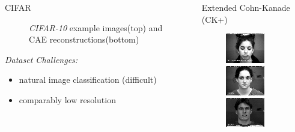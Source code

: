\documentclass[final]{beamer}
\newlength{\onecolwid}
\newlength{\threecolwid}
\begin{document}
\begin{frame}[t]
\begin{columns}[t]
\begin{column}{\threecolwid}
\begin{columns}[T, totalwidth=\threecolwid]
\begin{column}{\onecolwid}
\begin{block}{CIFAR}
\begin{figure}
\caption{\emph{CIFAR-10} example images(top) and CAE reconstructions(bottom)}

\end{figure}

\emph{Dataset Challenges:}
\begin{itemize}
\item natural image classification (difficult)
\item comparably low resolution
\end{itemize}
\end{block}
\end{column}

\begin{column}{\onecolwid}
\begin{block}{Extended Cohn-Kanade (CK+)}
\begin{figure}
\centering
\includegraphics[width=0.3\linewidth]{graphics/reconstructions/ckplus/input_00.png}
\includegraphics[width=0.3\linewidth]{graphics/reconstructions/ckplus/input_01.png}
\includegraphics[width=0.3\linewidth]{graphics/reconstructions/ckplus/input_02.png}


\end{figure}
\end{block}
\end{column}
\end{columns}
\end{column}
\end{columns}
\end{frame}
\end{document}
